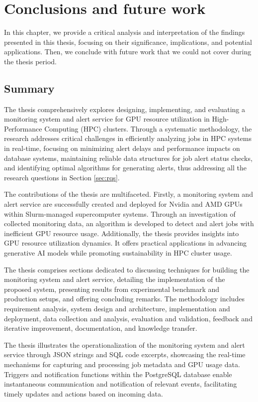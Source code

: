 \chapter{Conclusions and future work}
\label{chap:conclusions}
In this chapter, we provide a critical analysis and interpretation of the findings presented in this thesis, focusing on their significance, implications, and potential applications. Then, we conclude with future work that we could not cover during the thesis period.

\section{Summary}

The thesis comprehensively explores designing, implementing, and evaluating a monitoring system and alert service for GPU resource utilization in High-Performance Computing (HPC) clusters. Through a systematic methodology, the research addresses critical challenges in efficiently analyzing jobs in HPC systems in real-time, focusing on minimizing alert delays and performance impacts on database systems, maintaining reliable data structures for job alert status checks, and identifying optimal algorithms for generating alerts, thus addressing all the research questions in Section \ref{sec:rqs}.

The contributions of the thesis are multifaceted. Firstly, a monitoring system and alert service are successfully created and deployed for Nvidia and AMD GPUs within Slurm-managed supercomputer systems. Through an investigation of collected monitoring data, an algorithm is developed to detect and alert jobs with inefficient GPU resource usage. Additionally, the thesis provides insights into GPU resource utilization dynamics. It offers practical applications in advancing generative AI models while promoting sustainability in HPC cluster usage.

The thesis comprises sections dedicated to discussing techniques for building the monitoring system and alert service, detailing the implementation of the proposed system, presenting results from experimental benchmark and production setups, and offering concluding remarks. The methodology includes requirement analysis, system design and architecture, implementation and deployment, data collection and analysis, evaluation and validation, feedback and iterative improvement, documentation, and knowledge transfer.

The thesis illustrates the operationalization of the monitoring system and alert service through JSON strings and SQL code excerpts, showcasing the real-time mechanisms for capturing and processing job metadata and GPU usage data. Triggers and notification functions within the PostgreSQL database enable instantaneous communication and notification of relevant events, facilitating timely updates and actions based on incoming data.

